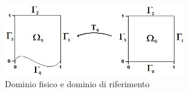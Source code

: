 

\begin{figure}[h]
	\centering
	\includegraphics[width=0.7\textwidth]{img/Domini.jpg}
	\caption{Dominio fisico e dominio di riferimento}
\label{fig:domini}
\end{figure}